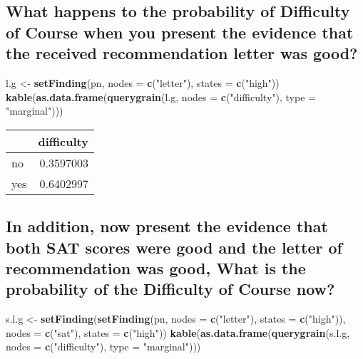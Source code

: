 \documentclass[]{article}
\newenvironment{Shaded}{\begin{snugshade}}{\end{snugshade}}
\newcommand{\KeywordTok}[1]{\textcolor[rgb]{0.13,0.29,0.53}{\textbf{{#1}}}}
\newcommand{\DataTypeTok}[1]{\textcolor[rgb]{0.13,0.29,0.53}{{#1}}}
\newcommand{\StringTok}[1]{\textcolor[rgb]{0.31,0.60,0.02}{{#1}}}
\newcommand{\NormalTok}[1]{{#1}}
\begin{document}
\newpage

\subsection{What happens to the probability of Difficulty of Course when
you present the evidence that the received recommendation letter was
good?}\label{what-happens-to-the-probability-of-difficulty-of-course-when-you-present-the-evidence-that-the-received-recommendation-letter-was-good}

\begin{Shaded}
\begin{Highlighting}[]
\NormalTok{l.g <-}\StringTok{ }\KeywordTok{setFinding}\NormalTok{(pn, }\DataTypeTok{nodes =} \KeywordTok{c}\NormalTok{(}\StringTok{"letter"}\NormalTok{), }\DataTypeTok{states =} \KeywordTok{c}\NormalTok{(}\StringTok{"high"}\NormalTok{))}
\KeywordTok{kable}\NormalTok{(}\KeywordTok{as.data.frame}\NormalTok{(}\KeywordTok{querygrain}\NormalTok{(l.g, }\DataTypeTok{nodes =} \KeywordTok{c}\NormalTok{(}\StringTok{"difficulty"}\NormalTok{), }\DataTypeTok{type =} \StringTok{"marginal"}\NormalTok{)))}
\end{Highlighting}
\end{Shaded}

\begin{longtable}[]{@{}lr@{}}
\toprule
& difficulty\tabularnewline
\midrule
\endhead
no & 0.3597003\tabularnewline
yes & 0.6402997\tabularnewline
\bottomrule
\end{longtable}

\subsection{In addition, now present the evidence that both SAT scores
were good and the letter of recommendation was good, What is the
probability of the Difficulty of Course
now?}\label{in-addition-now-present-the-evidence-that-both-sat-scores-were-good-and-the-letter-of-recommendation-was-good-what-is-the-probability-of-the-difficulty-of-course-now}

\begin{Shaded}
\begin{Highlighting}[]
\NormalTok{s.l.g <-}\StringTok{ }\KeywordTok{setFinding}\NormalTok{(}\KeywordTok{setFinding}\NormalTok{(pn, }\DataTypeTok{nodes =} \KeywordTok{c}\NormalTok{(}\StringTok{"letter"}\NormalTok{), }\DataTypeTok{states =} \KeywordTok{c}\NormalTok{(}\StringTok{"high"}\NormalTok{)), }
    \DataTypeTok{nodes =} \KeywordTok{c}\NormalTok{(}\StringTok{"sat"}\NormalTok{), }\DataTypeTok{states =} \KeywordTok{c}\NormalTok{(}\StringTok{"high"}\NormalTok{))}
\KeywordTok{kable}\NormalTok{(}\KeywordTok{as.data.frame}\NormalTok{(}\KeywordTok{querygrain}\NormalTok{(s.l.g, }\DataTypeTok{nodes =} \KeywordTok{c}\NormalTok{(}\StringTok{"difficulty"}\NormalTok{), }\DataTypeTok{type =} \StringTok{"marginal"}\NormalTok{)))}
\end{Highlighting}
\end{Shaded}
\end{document}
